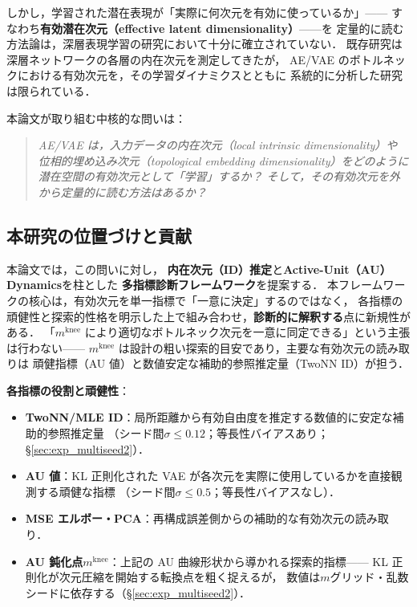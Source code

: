 \documentclass[11pt,a4paper]{jsarticle}
\newcommand{\mknee}{m^{\mathrm{knee}}}
\begin{document}
しかし，学習された潜在表現が「実際に何次元を有効に使っているか」——
すなわち\textbf{有効潜在次元（effective latent dimensionality）}——を
定量的に読む方法論は，深層表現学習の研究において十分に確立されていない．
既存研究\cite{ansuini2019intrinsic,valeriani2023geometry}は
深層ネットワークの各層の内在次元を測定してきたが，
AE/VAE のボトルネックにおける有効次元を，その学習ダイナミクスとともに
系統的に分析した研究は限られている．

本論文が取り組む中核的な問いは：
\begin{quote}
\textit{AE/VAE は，入力データの内在次元（local intrinsic dimensionality）や
位相的埋め込み次元（topological embedding dimensionality）をどのように
潜在空間の有効次元として「学習」するか？
そして，その有効次元を外から定量的に読む方法はあるか？}
\end{quote}

\subsection{本研究の位置づけと貢献}\label{sec:intro_aim}

本論文では，この問いに対し，
\textbf{内在次元（ID）推定}と\textbf{Active-Unit（AU）Dynamics}を柱とした
\textbf{多指標診断フレームワーク}を提案する．
本フレームワークの核心は，有効次元を単一指標で「一意に決定」するのではなく，
各指標の頑健性と探索的性格を明示した上で組み合わせ，\textbf{診断的に解釈する}点に新規性がある．
「$\mknee$ により適切なボトルネック次元を一意に同定できる」という主張は行わない——
$\mknee$ は設計の粗い探索的目安であり，主要な有効次元の読み取りは
頑健指標（AU 値）と数値安定な補助的参照推定量（TwoNN ID）が担う．

\textbf{各指標の役割と頑健性}：
\begin{itemize}
  \item \textbf{TwoNN/MLE ID}：局所距離から有効自由度を推定する数値的に安定な補助的参照推定量
        （シード間$\sigma \leq 0.12$；等長性バイアスあり；§\ref{sec:exp_multiseed2}）．
  \item \textbf{AU 値}：KL 正則化された VAE が各次元を実際に使用しているかを直接観測する頑健な指標
        （シード間$\sigma \leq 0.5$；等長性バイアスなし）．
  \item \textbf{MSE エルボー・PCA}：再構成誤差側からの補助的な有効次元の読み取り．
  \item \textbf{AU 鈍化点$\mknee$}：上記の AU 曲線形状から導かれる探索的指標——
        KL 正則化が次元圧縮を開始する転換点を粗く捉えるが，
        数値は$m$グリッド・乱数シードに依存する（§\ref{sec:exp_multiseed2}）．
\end{itemize}
\end{document}
